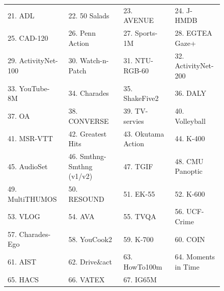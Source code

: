 \begin{figure}[t]
{\begin{tabular}{llll}
      21. ADL~\citep{pirsiavash2012detecting} &
      22. 50 Salads~\citep{stein2013combining} &
      23. AVENUE~\citep{lu2013abnormal} &
      24. J-HMDB~\citep{jhuang2013towards} \\
      25. CAD-120~\citep{koppula2013learning} &
      26. Penn Action~\citep{zhang2013actemes} &
      27. Sports-1M~\citep{karpathy2014large} & 
      28. EGTEA Gaze+~\citep{li2015delving} \\
      29. ActivityNet-100~\citep{caba2015activitynet} &
      30. Watch-n-Patch~\citep{wu2015watch} &
      31. NTU-RGB-60~\citep{shahroudy2016ntu} &
      32. ActivityNet-200~\citep{caba2015activitynet} \\
      33. YouTube-8M~\citep{abu2016youtube} &
      34. Charades~\citep{sigurdsson2016hollywood} &
      35. ShakeFive2~\citep{van2016spatio} &
      36. DALY~\citep{weinzaepfel2016towards} \\
      37. OA~\citep{li2016recognition} &
      38. CONVERSE~\citep{edwards2016pose} &
      39. TV-servies~\citep{de2016online} & 
      40. Volleyball~\citep{ibrahim2016hierarchical} \\
      41. MSR-VTT~\citep{xu2016msr} &
      42. Greatest Hits~\citep{owens2016visually} &
      43. Okutama Action~\citep{barekatain2017okutama} &
      44. K-400~\citep{kay2017kinetics} \\
      45. AudioSet~\citep{gemmeke2017audio} &
      46. Smthng-Smthng (v1/v2)~\citep{goyal2017something} &
      47. TGIF~\citep{jang2017tgif} &
      48. CMU Panoptic~\citep{joo2017panoptic} \\
      49. MultiTHUMOS~\citep{yeung2018every} &  
      50. RESOUND~\citep{li2018resound} &
      51. EK-55~\citep{damen2018scaling} &
      52. K-600~\citep{carreira2018short} \\
      53. VLOG~\citep{fouhey2018lifestyle} &
      54. AVA~\citep{gu2018ava} &
      55. TVQA~\citep{lei2018tvqa} &
      56. UCF-Crime~\citep{sultani2018real} \\
      57. Charades-Ego~\citep{sigurdsson2018charades} &
      58. YouCook2~\citep{zhou2018towards} &
      59. K-700~\citep{carreira2019short} &
      60. COIN~\citep{tang2019coin} \\
      61. AIST~\citep{tsuchida2019aist} &
      62. Drive\&act~\citep{martin2019drive} &
      63. HowTo100m~\citep{miech2019howto100m}&
      64. Moments in Time~\citep{monfort2019moments} \\
      65. HACS~\citep{zhao2019hacs} &
      66. VATEX~\citep{wang2019vatex} &
      67. IG65M~\citep{ghadiyaram2019large} &

\end{tabular}}
\end{figure}
